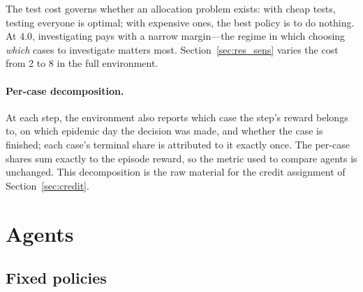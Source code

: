 \documentclass[11pt,a4paper]{article}
\begin{document}
The test cost governs whether an allocation problem exists: with cheap tests, testing everyone is optimal; with expensive ones, the best policy is to do nothing. At $4.0$, investigating pays with a narrow margin---the regime in which choosing \emph{which} cases to investigate matters most. Section~\ref{sec:res_sens} varies the cost from 2 to 8 in the full environment.

\paragraph{Per-case decomposition.} At each step, the environment also reports which case the step's reward belongs to, on which epidemic day the decision was made, and whether the case is finished; each case's terminal share is attributed to it exactly once. The per-case shares sum exactly to the episode reward, so the metric used to compare agents is unchanged. This decomposition is the raw material for the credit assignment of Section~\ref{sec:credit}.

\section{Agents}
\label{sec:agents}

\subsection{Fixed policies}
\end{document}
